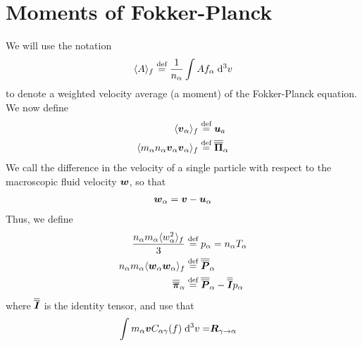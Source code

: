 \section{Moments of Fokker-Planck}
We will use the notation
%
\begin{align*}
    \expt{A}_f \defined \frac{1}{n_\a}\inde{Af_\a}{^3v}
\end{align*}
%
to denote a weighted velocity average (a moment) of the Fokker-Planck equation.
We now define
%
\begin{align*}
    \expt{\ve{v}_\a}_f        \defined& \; \ve{u}_a      \\
    \expt{m_\a n_\a \ve{v}_\a\ve{v}_\a}_f \defined&\; \te{\Pi}_\a
\end{align*}
%
We call the difference in the velocity of a single particle with respect to the macroscopic fluid velocity $\ve{w}$, so that
%
\begin{align*}
    \ve{w}_\a = \ve{v} - \ve{u}_\a
\end{align*}
%
Thus, we define
%
\begin{align*}
    \frac{n_\a m_\a\expt{w_\a^2}_f}{3} \defined& \; p_\a = n_\a T_\a\\
    n_\a m_\a\expt{\ve{w}_{\a}\ve{w}_{\a}}_f \defined& \; \te{P}_\a\\
    \te{\pi}_\a \defined& \; \te{P}_\a - \te{I}p_\a\\
\end{align*}
%
where $\te{I}$ is the identity tensor, and use that
%
\begin{align*}
    \inde{m_\a\ve{v} C_{\a\g}(f)}{^3v} =& \ve{R}_{\g\to\a}
\end{align*}
%

